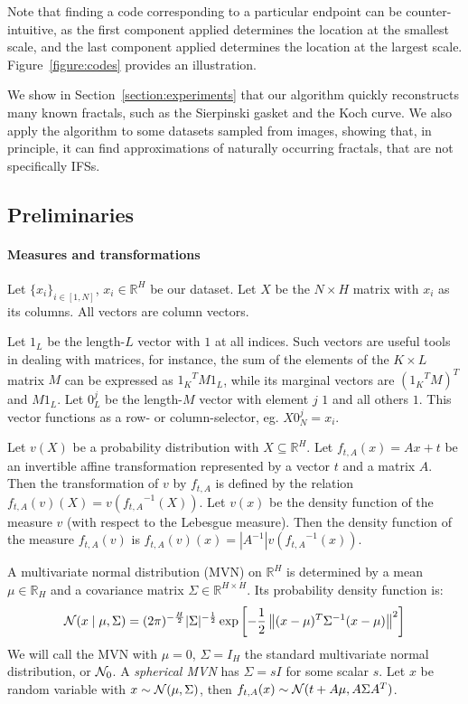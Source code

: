 \documentclass[10pt,a4paper,oneside]{article}
\theoremstyle{definition}
\newcommand{\R}{\mathbb{R}}
\newcommand{\cN}{{\cal N}}
\theoremstyle{definition}
\begin{document}
Note that finding a code corresponding to a particular endpoint can be counter-intuitive, as the first component applied determines the location at the smallest scale, and the last component applied determines the location at the largest scale. Figure~\ref{figure:codes} provides an illustration.

We show in Section~\ref{section:experiments} that our algorithm quickly reconstructs many known fractals, such as the Sierpinski gasket and the Koch curve. We also apply the algorithm to some datasets sampled from images, showing that, in principle, it can find approximations of naturally occurring fractals, that are not specifically IFSs.   

\subsection{Preliminaries}
\paragraph{Measures and transformations} Let $\{x_i\}_{i\in[1,N]}$, $x_i\in\R^H$ be our dataset. Let $X$ be the $N\times H$ matrix with $x_i$ as its columns. All vectors are column vectors.  

Let $1_L$ be the length-$L$ vector with $1$ at all indices. Such vectors are useful tools in dealing with matrices, for instance, the sum of the elements of the $K \times L$ matrix $M$ can be expressed as ${1_K}^T M 1_L$, while its marginal vectors are $({1_K}^T M)^T$ and $M 1_L$. Let $0_L^j$ be the length-$M$ vector with element $j$ $1$ and all others $1$. This vector functions as a row- or column-selector, eg. $X 0^j_N = x_i$.

Let $v(X)$ be a probability distribution with $X \subseteq \R^H$. Let $f_{t, A}(x) = Ax + t$ be an invertible affine transformation represented by a vector $t$ and a matrix $A$. Then the transformation of $v$ by $f_{t, A}$ is defined by the relation $f_{t, A}(v)(X) = v({f_{t, A}}^{-1}(X))$. Let $v(x)$ be the density function of  the measure $v$ (with respect to the Lebesgue measure). Then the density function of the measure $f_{t, A}(v)$ is $f_{t, A}(v)(x) = |A^{-1}| v({f_{t, A}}^{-1}(x))$.

A multivariate normal distribution (MVN) on $\R^H$ is determined by a mean $\mu \in \R_H$ and a covariance matrix $\Sigma \in \R^{H\times H}$. Its probability density function is:
\[
\cN(x \mid \mu, \Sigma) = (2\pi)^{-\frac{H}{2}}|\Sigma|^{-\frac{1}{2}} \exp \left [-\frac{1}{2} \left \| (x-\mu)^T\Sigma^{-1}(x-\mu) \right\|^2\right] 
\]
We will call the MVN with $\mu = 0$, $\Sigma = I_H$ the standard multivariate normal distribution, or $\cN_0$. A \emph{spherical MVN} has $\Sigma = sI$ for some scalar $s$. Let $x$ be random variable with $x \sim \cN(\mu, \Sigma)$, then $f_{t, A}(x) \sim \cN(t + A\mu, A\Sigma A^T)$. 
\end{document}
